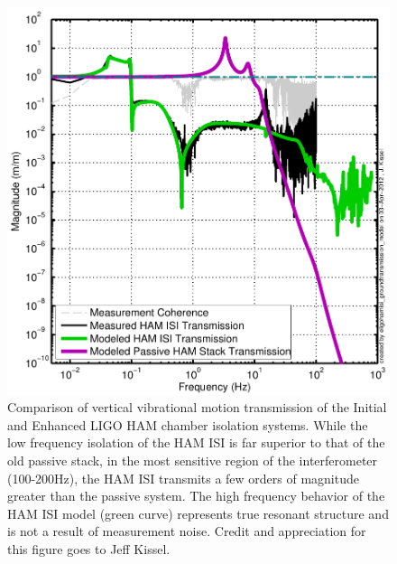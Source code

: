 \begin{figure}
  \begin{center}
  \leavevmode
  \includegraphics{figs-jitter/hamtransmission.pdf}
  \end{center}
  \caption[Comparison of vertical vibrational motion transmission of the Initial and Enhanced LIGO HAM chamber isolation systems.]{Comparison of vertical vibrational motion transmission of the Initial and Enhanced LIGO HAM chamber isolation systems. While the low frequency isolation of the HAM ISI is far superior to that of the old passive stack, in the most sensitive region of the interferometer (100-200Hz), the HAM ISI transmits a few orders of magnitude greater than the passive system. The high frequency behavior of the HAM ISI model (green curve) represents true resonant structure and is not a result of measurement noise. Credit and appreciation for this figure goes to Jeff Kissel.}
  \label{fig:hamtransmission}
\end{figure}

